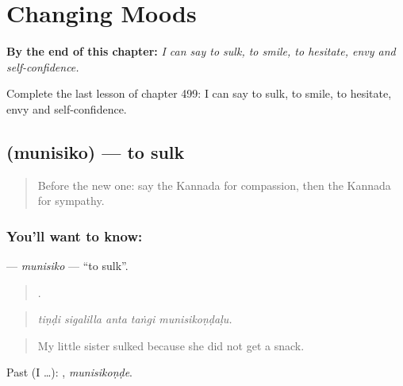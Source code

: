 
\chapter{Changing Moods}
\label{ch:ka-changing-moods}

\begin{chapteropening}
\textbf{By the end of this chapter:} \emph{I can say to sulk, to smile, to hesitate, envy and self-confidence.}

Complete the last lesson of chapter 499: I can say to sulk, to smile, to hesitate, envy and self-confidence.
\end{chapteropening}

\section[\texorpdfstring{\kn{ಮುನಿಸಿಕೊ} (munisiko)}{ಮುನಿಸಿಕೊ (munisiko)}]{ (munisiko) — to sulk}

\label{lesson:KA-C499-munisiko}



\begin{quote}
Before the new one: say the Kannada for compassion, then the Kannada for sympathy.
\end{quote}

\subsection*{You'll want to know: }
\textbf{} — \emph{munisiko} — \textquotedblleft{}to sulk\textquotedblright{}.

\begin{quote}
    .
\end{quote}

\begin{quote}
\emph{tiṇḍi sigalilla anta taṅgi munisikoṇḍaḷu.}
\end{quote}

\begin{quote}
My little sister sulked because she did not get a snack.
\end{quote}

Past (I …): , \emph{munisikoṇḍe}.

